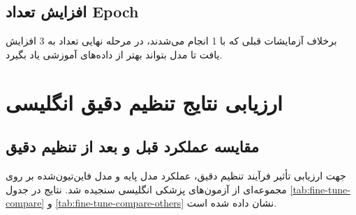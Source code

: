 \documentclass[11pt, a4paper, oneside]{book}
\begin{document}
	\subsection{افزایش تعداد Epoch}
	برخلاف آزمایشات قبلی که با 1  انجام می‌شدند، در مرحله نهایی تعداد  به 3 افزایش یافت تا مدل بتواند بهتر از داده‌های آموزشی یاد بگیرد.

	\section{ارزیابی نتایج تنظیم دقیق انگلیسی}
	\subsection{مقایسه عملکرد قبل و بعد از تنظیم دقیق}
	جهت ارزیابی تأثیر فرآیند تنظیم دقیق، عملکرد مدل پایه و مدل فاین‌تیون‌شده بر روی مجموعه‌ای از آزمون‌های پزشکی انگلیسی سنجیده شد. نتایج در جدول \ref{tab:fine-tune-compare} و \ref{tab:fine-tune-compare-others} نشان داده شده است.

	\begin{table}[h!]
		\centering
		\caption{مقایسه عملکرد مدل قبل و بعد از تنظیم دقیق انگلیسی}
		\label{tab:fine-tune-compare}
		\begin{latin}    
		\end{latin}
	\end{table}
\end{document}
